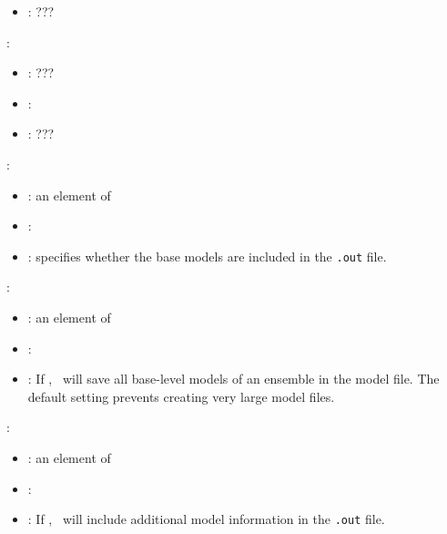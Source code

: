 \begin{itemize}
{\begin{itemize}
                \item \optionDescrption{}: ???
           \end{itemize}
    \item {}:
           \begin{itemize}
                \item \optionPossibleValues{}: ???
                \item \optionDefaultValue{}: 
                \item \optionDescrption{}: ???
           \end{itemize}
    }
    \item {}:
           \begin{itemize}
                \item \optionPossibleValues{}: an element of  
                \item \optionDefaultValue{}: 
                \item \optionDescrption{}: specifies whether the base models are included in the \texttt{.out} file.
           \end{itemize}
    \item {}:
           \begin{itemize}
                \item \optionPossibleValues{}: an element of 
                \item \optionDefaultValue{}: 
                \item \optionDescrption{}: If , \clus\ will save all base-level models of an ensemble in the model file. The default setting prevents creating very large model files.
           \end{itemize}
    \item {}:
           \begin{itemize}
                \item \optionPossibleValues{}: an element of 
                \item \optionDefaultValue{}: 
                \item \optionDescrption{}: If , \clus\ will include additional model information in the \texttt{.out} file.

\end{itemize}
\end{itemize}

